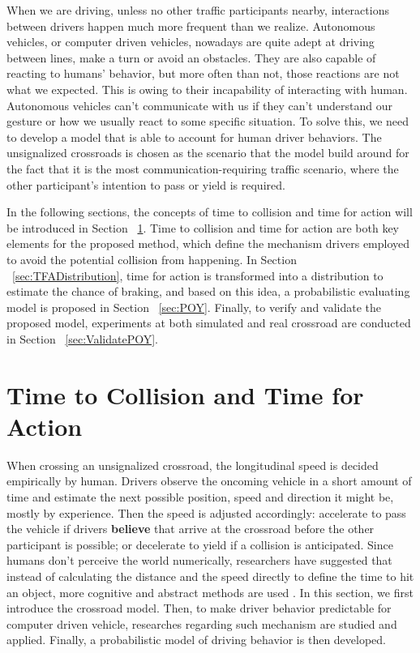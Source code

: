 
When we are driving, unless no other traffic participants nearby, interactions between drivers happen much more frequent than we realize. Autonomous vehicles, or computer driven vehicles, nowadays are quite adept at driving between lines, make a turn or avoid an obstacles. They are also capable of reacting to humans' behavior, but more often than not, those reactions are not what we expected. This is owing to their incapability of interacting with human. Autonomous vehicles can't communicate with us if they can't understand our gesture or how we usually react to some specific situation. To solve this, we need to develop a model that is able to account for human driver behaviors. The unsignalized crossroads is chosen as the scenario that the model build around for the fact that it is the most communication-requiring traffic scenario, where the other participant's intention to pass or yield is required.

In the following sections, the concepts of time to collision and time for action will be introduced in Section ~\ref{sec:TTCandTFA}. Time to collision and time for action are both key elements for the proposed method, which define the mechanism drivers employed to avoid the potential collision from happening. In Section ~\ref{sec:TFADistribution}, time for action is transformed into a distribution to estimate the chance of braking, and based on this idea, a probabilistic evaluating model is proposed in Section ~\ref{sec:POY}. Finally, to verify and validate the proposed model, experiments at both simulated and real crossroad are conducted in Section ~\ref{sec:ValidatePOY}.



\section{Time to Collision and Time for Action}
\label{sec:TTCandTFA}
When crossing an unsignalized crossroad, the longitudinal speed is decided empirically by human. Drivers observe the oncoming vehicle in a short amount of time and estimate the next possible position, speed and direction it might be, mostly by experience. Then the speed is adjusted accordingly: accelerate to pass the vehicle if drivers \textbf{believe} that arrive at the crossroad before the other participant is possible; or decelerate to yield if a collision is anticipated. Since humans don't perceive the world numerically, researchers have suggested that instead of calculating the distance and the speed directly to define the time to hit an object, more cognitive and abstract methods are used \cite{cog}. In this section, we first introduce the crossroad model. Then, to make driver behavior predictable for computer driven vehicle, researches regarding such mechanism are studied and applied. Finally, a probabilistic model of driving behavior is then developed.

